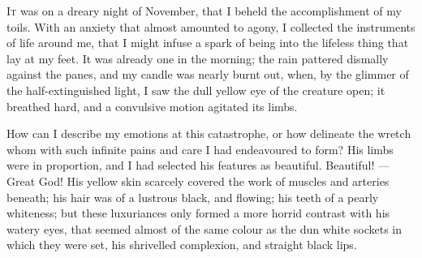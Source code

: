 
\textsc{It} was on a dreary night of November,
that I beheld the accomplishment
of my toils. With an anxiety that almost
amounted to agony, I collected
the instruments of life around me, that
I might infuse a spark of being into
the lifeless thing that lay at my feet.
It was already one in the morning; the
rain pattered dismally against the panes,
and my candle was nearly burnt out,
when, by the glimmer of the half-extinguished
light, I saw the dull yellow
eye of the creature open; it breathed
hard, and a convulsive motion agitated
its limbs.

How can I describe my emotions at
this catastrophe, or how delineate the
wretch whom with such infinite pains
and care I had endeavoured to form?
His limbs were in proportion, and I
had selected his features as beautiful.
Beautiful! --- Great God! His yellow skin
scarcely covered the work of muscles
and arteries beneath; his hair was of a
lustrous black, and flowing; his teeth
of a pearly whiteness; but these luxuriances
only formed a more horrid contrast
with his watery eyes, that seemed
almost of the same colour as the dun
white sockets in which they were set,
his shrivelled complexion, and straight
black lips.

